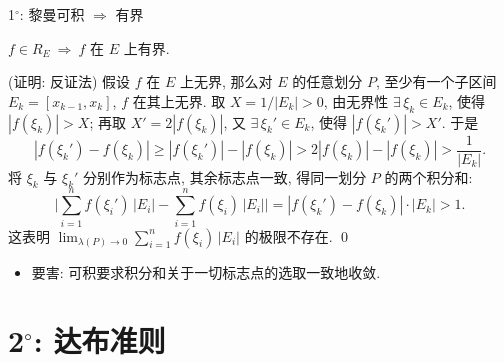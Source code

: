 \begin{frame}{1$^\circ$: 黎曼可积 $\Longrightarrow$ 有界}

\begin{prop}
$f \in R_E \ \Longrightarrow\ f$ 在 $E$ 上有界.
\end{prop}

\startproof[bg=yellow, fg=red](证明: 反证法)
假设 $f$ 在 $E$ 上无界, 那么对 $E$ 的\alert{任意}划分 $P$, 至少有一个子区间
$E_k = [x_{k-1}, x_k]$, $f$ 在其上无界. 取 $X = 1/|E_k| > 0$,
由无界性 $\exists\, \xi_k \in E_k$, 使得 $|f(\xi_k)| > X$;
再取 $X' = 2|f(\xi_k)|$, 又 $\exists\, \xi_k' \in E_k$, 使得 $|f(\xi_k')| > X'$. 于是
\[
|f(\xi_k') - f(\xi_k)|
\geqslant |f(\xi_k')| - |f(\xi_k)|
> 2|f(\xi_k)| - |f(\xi_k)|
> \frac{1}{|E_k|} .
\]
将 $\xi_k$ 与 $\xi_k'$ 分别作为标志点, \alert{其余标志点一致}, 得同一划分 $P$ 的两个积分和:
\[
\Big| \sum_{i=1}^{n} f(\xi_i')\, |E_i| - \sum_{i=1}^{n} f(\xi_i)\, |E_i| \Big|
= |f(\xi_k') - f(\xi_k)| \cdot |E_k| > 1 .
\]
这表明 $\displaystyle \lim_{\lambda(P) \to 0} \sum_{i=1}^{n} f(\xi_i)\, |E_i|$ 的极限不存在. \qed

\pause

\begin{itemize}
\item 要害: 可积要求积分和关于\alert{一切}标志点的选取一致地收敛.
\end{itemize}

\end{frame}


\section[达布准则]{2$^\circ$: 达布准则}


